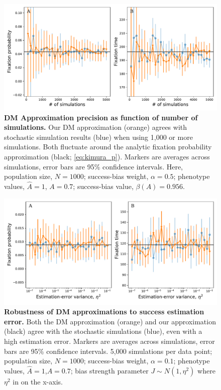 \documentclass[12pt]{extarticle}
\begin{document}
\begin{figure}[h]
    \includegraphics[width=\linewidth]{num_sims.pdf}
  \caption{
  \textbf{DM Approximation precision as function of number of simulations.}
  Our DM approximation (orange) agrees with stochastic simulation results (blue) when using 1,000 or more simulations.
  Both fluctuate around the analytic fixation probability approximation (black; \cref{eq:kimura_p}).
  Markers are averages across simulations, error bars are 95\% confidence intervals.
  Here, population size, $N=1000$; success-bias weight, $\alpha=0.5$; phenotype values, $\hat{A}=1$, $A=0.7$; success-bias value, $\beta(A)=0.956$.}	
  \label{fig:num_sims}
\end{figure}


\begin{figure}
    \includegraphics[width=\linewidth]{full_vs_dm_mutation.pdf}
  \caption{
  \textbf{Robustness of DM approximations to success estimation error.}
  Both the DM approximation (orange) and our approximation (black) agree with the stochastic simulations (blue), even with a high estimation error.
  Markers are averages across simulations, error bars are 95\% confidence intervals.
  5,000 simulations per data point; population size, $N=1000$; success-bias weight, $\alpha=0.1$; phenotype values, $\hat{A}=1$,$A=0.7$; bias strength parameter $J\sim N(1,\eta^2)$ where $\eta^2$ in on the x-axis.
  }	
  \label{fig:hetro_error}
\end{figure}
\end{document}
